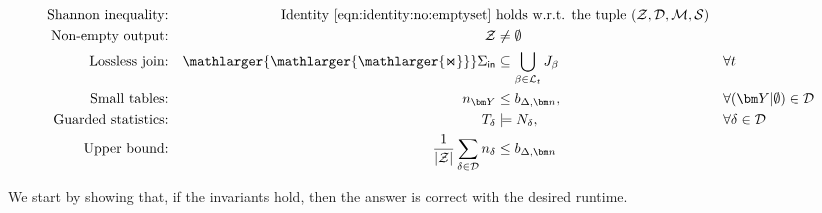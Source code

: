 \documentclass{theoretics}
\newcommand{\calM}{\mathcal M}
\newcommand{\calS}{\mathcal S}
\newcommand{\calD}{\mathcal D}
\newcommand{\calL}{\mathcal L}
\newcommand{\calZ}{\mathcal Z}
\newcommand{\bigjoin}{\mathlarger{\mathlarger{\mathlarger{\Join}}}}
\newcommand{\inn}{\text{\sf in}}
\begin{document}
\begin{align}
  \mbox{Shannon inequality:} && \mbox{Identity~\eqref{eqn:identity:no:emptyset} } & \mbox{holds
w.r.t. the tuple $(\calZ, \calD, \calM, \calS)$} \label{eq:shannon:invariant}\\
  \mbox{Non-empty output:} && \calZ & \neq \emptyset \label{eq:invariant:output}\\
  \mbox{Lossless join:} &&  \bigjoin \Sigma_{\inn} & \subseteq
  \bigcup_{\beta\in \calL_t} J_\beta
  && \forall t \label{eq:invariant:join}\\
  \mbox{Small tables:} &&
    n_{\bm Y} &\leq b_{\Delta,\bm n}, && \forall (\bm Y| \emptyset) \in \calD \label{eq:invariant:small}\\
  \mbox{Guarded statistics:} && T_\delta &\models N_\delta, && \forall \delta \in \calD \label{eq:invariant:stats}\\
  \mbox{Upper bound:} && \frac{1}{|\calZ|}\sum_{\delta\in \calD} n_{\delta} &\leq b_{\Delta, \bm n}\label{eq:invariant:upper:bound}
\end{align}


We start by showing that, if the invariants hold, then the answer is correct with the
desired runtime.
\end{document}

